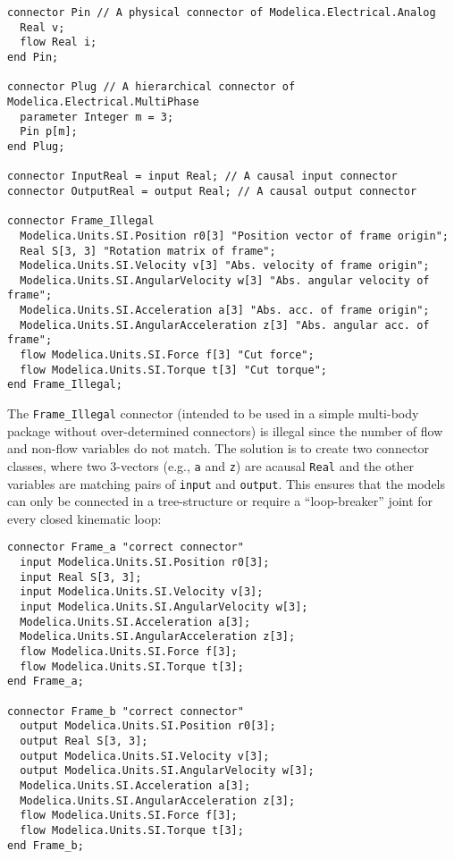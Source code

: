 \begin{example}
\begin{lstlisting}[language=modelica]
connector Pin // A physical connector of Modelica.Electrical.Analog
  Real v;
  flow Real i;
end Pin;

connector Plug // A hierarchical connector of Modelica.Electrical.MultiPhase
  parameter Integer m = 3;
  Pin p[m];
end Plug;

connector InputReal = input Real; // A causal input connector
connector OutputReal = output Real; // A causal output connector

connector Frame_Illegal
  Modelica.Units.SI.Position r0[3] "Position vector of frame origin";
  Real S[3, 3] "Rotation matrix of frame";
  Modelica.Units.SI.Velocity v[3] "Abs. velocity of frame origin";
  Modelica.Units.SI.AngularVelocity w[3] "Abs. angular velocity of frame";
  Modelica.Units.SI.Acceleration a[3] "Abs. acc. of frame origin";
  Modelica.Units.SI.AngularAcceleration z[3] "Abs. angular acc. of frame";
  flow Modelica.Units.SI.Force f[3] "Cut force";
  flow Modelica.Units.SI.Torque t[3] "Cut torque";
end Frame_Illegal;
\end{lstlisting}

The \lstinline!Frame_Illegal! connector (intended to be used in a simple multi-body package without over-determined connectors) is illegal since the number of flow and non-flow variables do not match.
The solution is to create two connector classes, where two 3-vectors (e.g., \lstinline!a! and \lstinline!z!) are acausal \lstinline!Real! and the other variables are matching pairs of \lstinline!input! and \lstinline!output!.
This ensures that the models can only be connected in a tree-structure or require a ``loop-breaker'' joint for every closed kinematic loop:
\begin{lstlisting}[language=modelica]
connector Frame_a "correct connector"
  input Modelica.Units.SI.Position r0[3];
  input Real S[3, 3];
  input Modelica.Units.SI.Velocity v[3];
  input Modelica.Units.SI.AngularVelocity w[3];
  Modelica.Units.SI.Acceleration a[3];
  Modelica.Units.SI.AngularAcceleration z[3];
  flow Modelica.Units.SI.Force f[3];
  flow Modelica.Units.SI.Torque t[3];
end Frame_a;

connector Frame_b "correct connector"
  output Modelica.Units.SI.Position r0[3];
  output Real S[3, 3];
  output Modelica.Units.SI.Velocity v[3];
  output Modelica.Units.SI.AngularVelocity w[3];
  Modelica.Units.SI.Acceleration a[3];
  Modelica.Units.SI.AngularAcceleration z[3];
  flow Modelica.Units.SI.Force f[3];
  flow Modelica.Units.SI.Torque t[3];
end Frame_b;
\end{lstlisting}


\end{example}
